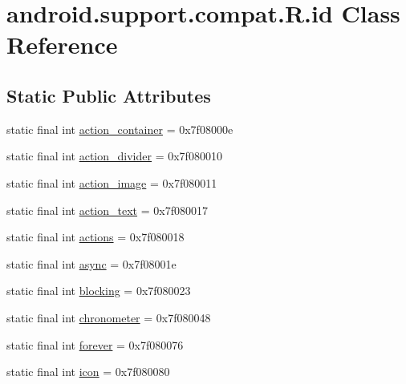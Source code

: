 \hypertarget{classandroid_1_1support_1_1compat_1_1_r_1_1id}{}\section{android.\+support.\+compat.\+R.\+id Class Reference}
\label{classandroid_1_1support_1_1compat_1_1_r_1_1id}
\subsection*{Static Public Attributes}
\begin{DoxyCompactItemize}
\item 
static final int \mbox{\hyperlink{classandroid_1_1support_1_1compat_1_1_r_1_1id_a7f80213ff3a91ef547ef997845e107fa}{action\+\_\+container}} = 0x7f08000e
\item 
static final int \mbox{\hyperlink{classandroid_1_1support_1_1compat_1_1_r_1_1id_a88be636aa39ce1c191888969702df488}{action\+\_\+divider}} = 0x7f080010
\item 
static final int \mbox{\hyperlink{classandroid_1_1support_1_1compat_1_1_r_1_1id_a70b58cd3ef96e20e98a2c558648a9df6}{action\+\_\+image}} = 0x7f080011
\item 
static final int \mbox{\hyperlink{classandroid_1_1support_1_1compat_1_1_r_1_1id_a4c632b55a9592c7a9bccd823efbfab93}{action\+\_\+text}} = 0x7f080017
\item 
static final int \mbox{\hyperlink{classandroid_1_1support_1_1compat_1_1_r_1_1id_aa1242e1c24112a4831977220dc8f7da4}{actions}} = 0x7f080018
\item 
static final int \mbox{\hyperlink{classandroid_1_1support_1_1compat_1_1_r_1_1id_a0b32e72d27792d595387386a89e994b6}{async}} = 0x7f08001e
\item 
static final int \mbox{\hyperlink{classandroid_1_1support_1_1compat_1_1_r_1_1id_ab36e5d91fa3344d7b8a7dc7c5b762da5}{blocking}} = 0x7f080023
\item 
static final int \mbox{\hyperlink{classandroid_1_1support_1_1compat_1_1_r_1_1id_a8a7fe10d3cc006c6e74a4f87a881ab2f}{chronometer}} = 0x7f080048
\item 
static final int \mbox{\hyperlink{classandroid_1_1support_1_1compat_1_1_r_1_1id_a94bea61e1bb09bcae816f3b5f0815f20}{forever}} = 0x7f080076
\item 
static final int \mbox{\hyperlink{classandroid_1_1support_1_1compat_1_1_r_1_1id_ab366864ddd2e01f97092f1b825cc943d}{icon}} = 0x7f080080
\item 

\end{DoxyCompactItemize}
